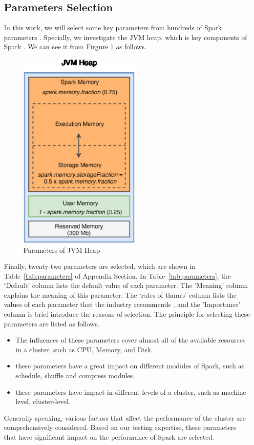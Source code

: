 \subsection{Parameters Selection}\label{subsec:parameters}
\par In this work, we will select some key parameters from hundreds of Spark parameters \cite{apachesparktuning}. Specially, we investigate the JVM heap, which is key components of Spark \cite{apachesparkmonitoring}. We can see it from Firgure \ref{fig:ParametersJVM} as follows.
\begin{figure}
	\centering
	\includegraphics[height=10cm]{3.eps}
	\caption{Parameters of JVM Heap}\label{fig:ParametersJVM}
\end{figure}
 \par Finally, twenty-two parameters are selected, which are shown in Table~\ref{tab:parameters} of Appendix Section.  In Table~\ref{tab:parameters}, the ‘Default’ column lists the default value of each parameter. The 'Meaning' column  explains the meaning of this parameter. The ‘rules of thumb’ column lists the values of each parameter that the industry recommends \cite{SparkConfiguration} \cite{Sparkhub}, and the 'Importance' column is brief introduce the reasons of selection.  The principle for selecting these parameters are listed as follows. 
\begin{itemize}
\item The influences of these parameters cover almost all of the available resources in a cluster, such as CPU, Memory, and Disk.
\item these parameters have a great impact on different modules of Spark, such as schedule, shuffle and compress modules. 
\item these parameters have impact in different levels of a cluster, such as machine-level, cluster-level.
\end{itemize} 
 \par  Generally speaking, various factors that affect the performance of the cluster are comprehensively considered. Based on our testing expertise, these parameters that have significant impact on the performance of Spark are selected.


